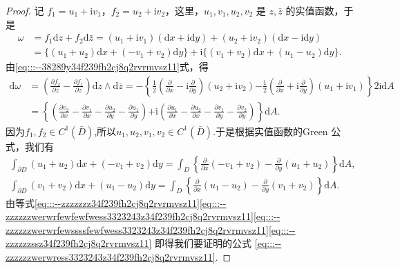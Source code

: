 \documentclass[../../main.tex]{subfiles}%
\begin{document}
\begin{proof}
记 \( f_1 = u_1 + \mathrm{i}v_1 \)，\( f_2 = u_2 + \mathrm{i}v_2 \)，这里，\( u_1,v_1,u_2,v_2 \) 是 \( z,\bar{z} \) 的实值函数，于是
\begin{align}\label{eq:::--zzzzzzz34f239fh2cj8q2rvrmvsz11}
\omega &= f_1 \mathrm{d}z + f_2 \mathrm{d}\bar{z} = (u_1 + \mathrm{i}v_1)(\mathrm{d}x + \mathrm{i}\mathrm{d}y) + (u_2 + \mathrm{i}v_2)(\mathrm{d}x - \mathrm{i}\mathrm{d}y) \nonumber \\
&= \{(u_1 + u_2)\mathrm{d}x + (-v_1 + v_2)\mathrm{d}y\}+ \mathrm{i}\{(v_1 + v_2)\mathrm{d}x + (u_1 - u_2)\mathrm{d}y\}.
\end{align}
由\eqref{eq:::--38289y34f239fh2cj8q2rvrmvsz11}式，得
\begin{align}
\mathrm{d}\omega &= \left( \frac{\partial f_2}{\partial z} - \frac{\partial f_1}{\partial \bar{z}} \right) \mathrm{d}z \wedge \mathrm{d}\bar{z} = -\left\{ \frac{1}{2} \left( \frac{\partial}{\partial x} - \mathrm{i} \frac{\partial}{\partial y} \right)(u_2 + \mathrm{i}v_2) \right. \left. - \frac{1}{2} \left( \frac{\partial}{\partial x} + \mathrm{i} \frac{\partial}{\partial y} \right)(u_1 + \mathrm{i}v_1) \right\} 2\mathrm{i}\mathrm{d}A \nonumber \\
&= \left\{ \left( \frac{\partial v_2}{\partial x} - \frac{\partial v_1}{\partial x} - \frac{\partial u_2}{\partial y} - \frac{\partial u_1}{\partial y} \right) \right. \left. + \mathrm{i} \left( \frac{\partial u_1}{\partial x} - \frac{\partial u_2}{\partial x} - \frac{\partial v_1}{\partial y} - \frac{\partial v_2}{\partial y} \right) \right\} \mathrm{d}A. \label{eq:::--zzzzzzwerwrfewfewfwess3323243z34f239fh2cj8q2rvrmvsz11}
\end{align}
因为\( f_1,f_2 \in C^1(\bar{D}) \),所以$u_1,u_2,v_1,v_2\in C^1(\bar{D})$.于是根据实值函数的Green 公式，我们有
\begin{gather}
\int_{\partial D} (u_1 + u_2)\mathrm{d}x + (-v_1 + v_2)\mathrm{d}y = \int_D \left\{ \frac{\partial}{\partial x}(-v_1 + v_2) - \frac{\partial}{\partial y}(u_1 + u_2) \right\} \mathrm{d}A, \label{eq:::--zzzzzzwerwrfewssssfewfwess3323243z34f239fh2cj8q2rvrmvsz11}
\\
\int_{\partial D} (v_1 + v_2)\mathrm{d}x + (u_1 - u_2)\mathrm{d}y = \int_D \left\{ \frac{\partial}{\partial x}(u_1 - u_2) - \frac{\partial}{\partial y}(v_1 + v_2) \right\} \mathrm{d}A. \label{eq:::--zzzzzzssz34f239fh2cj8q2rvrmvsz11}
\end{gather}
由等式\eqref{eq:::--zzzzzzz34f239fh2cj8q2rvrmvsz11}\eqref{eq:::--zzzzzzwerwrfewfewfwess3323243z34f239fh2cj8q2rvrmvsz11}\eqref{eq:::--zzzzzzwerwrfewssssfewfwess3323243z34f239fh2cj8q2rvrmvsz11}\eqref{eq:::--zzzzzzssz34f239fh2cj8q2rvrmvsz11} 即得我们要证明的公式 \eqref{eq:::--zzzzzzwerwress3323243z34f239fh2cj8q2rvrmvsz11}.
\end{proof}
\end{document}
